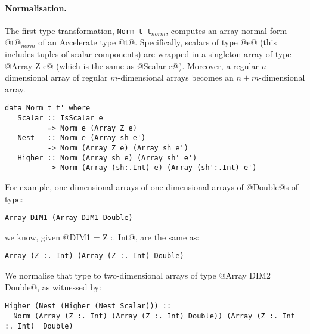 \paragraph{Normalisation.}
The first type transformation, \lstinline[style=ndp]{Norm t t}$_{\textit{norm}}$, computes an array normal form @t@$_{\textit{norm}}$ of an Accelerate type @t@. Specifically, scalars of type @e@ (this includes tuples of scalar components) are wrapped in a singleton array of type @Array Z e@ (which is the same as @Scalar e@). Moreover, a regular $n$-dimensional array of regular $m$-dimensional arrays becomes an $n+m$-dimensional array.
%
\begin{lstlisting}[style=ndp]
data Norm t t' where
   Scalar :: IsScalar e
          => Norm e (Array Z e)
   Nest   :: Norm e (Array sh e')
          -> Norm (Array Z e) (Array sh e')
   Higher :: Norm (Array sh e) (Array sh' e')
          -> Norm (Array (sh:.Int) e) (Array (sh':.Int) e')
\end{lstlisting}
%
For example, one-dimensional arrays of one-dimensional arrays of @Double@s of type:
%
\begin{lstlisting}[style=ndp]
Array DIM1 (Array DIM1 Double)
\end{lstlisting}
%
we know, given @DIM1 = Z :. Int@, are the same as:
%
\begin{lstlisting}[style=ndp]
Array (Z :. Int) (Array (Z :. Int) Double)
\end{lstlisting}

We normalise that type to two-dimensional arrays of type @Array DIM2 Double@, as witnessed by:
%
\begin{lstlisting}[style=ndp]
Higher (Nest (Higher (Nest Scalar))) ::
  Norm (Array (Z :. Int) (Array (Z :. Int) Double)) (Array (Z :. Int :. Int)  Double)
\end{lstlisting}

